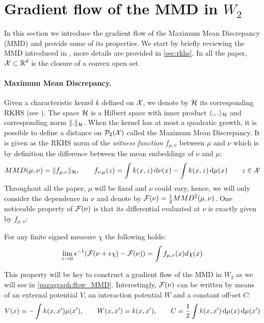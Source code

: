 
\section{Gradient flow of the MMD in $W_2$}\label{sec:gradient_flow}
In this section we introduce the gradient flow of the Maximum Mean Discrepancy (MMD) and provide some of its properties. We start by briefly reviewing the MMD introduced in \cite{gretton2012kernel}, more details are provided in \cref{sec:rkhs}. In all the paper, ${{\mathcal X}}\subset{{\mathbb R}}^d$ is the closure of a convex open set.
\paragraph{Maximum Mean Discrepancy.}\label{subsec:MMD}
Given a characteristic kernel $k$ defined on ${{\mathcal X}}$, we denote by ${{\mathcal H}}$ its corresponding RKHS (see \cite{smola1998learning}). The space ${{\mathcal H}}$ is a Hilbert space with inner product $\langle .,. \rangle_{{{\mathcal H}}}$ and corresponding norm $\Vert . \Vert_{{{\mathcal H}}}$.
When the kernel has at most a quadratic growth, it is possible to define a distance on $\mathcal{P}_2({{\mathcal X}})$ called the Maximum Mean Discrepancy. It is given as the RKHS norm of the \textit{witness function} $f_{\mu,\nu}$ between $\mu$ and $\nu$ which is by definition the difference between the mean embeddings of $\nu$ and $\mu$: 
\begin{align}\label{eq:witness_function}
MMD(\mu,\nu) = \Vert f_{\mu,\nu} \Vert_{{{\mathcal H}}}, \qquad f_{\nu,\mu}(z) = \int k(x,z)\mathop{}\!\mathrm{d} \nu(x) - \int k(x,z)\mathop{}\!\mathrm{d} \mu(x)  \qquad z\in {{\mathcal X}}
\end{align}
Throughout all the paper, $\mu$ will be fixed and $\nu$ could vary, hence, we will only consider the dependence in $\nu$ and denote by ${{\mathcal F}}(\nu)= \frac{1}{2}MMD^2(\mu,\nu)$. One noticeable property of ${{\mathcal F}}(\nu)$ is that its differential evaluated at $\nu$ is exactly given by $f_{\mu,\nu}$:
\begin{proposition}\label{prop:differential_mmd}
	For any finite signed measure $\chi$ the following holds:
	\begin{align}
		\lim_{\epsilon\rightarrow 0} \epsilon^{-1}({{\mathcal F}}(\nu +\epsilon\chi) - {{\mathcal F}}(\nu)) = \int f_{\mu,\nu}(x)d\chi(x) 
	\end{align}
\end{proposition}
This property will be key to construct a gradient flow of the MMD in $W_2$ as we will see in \cref{paragraph:flow_MMD}.
 Interestingly, ${{\mathcal F}}(\nu)$ can be written by means of an external potential $V$, an interaction potential $W$ and a constant off-set $C$:
\begin{align}\label{eq:potentials}
V(x)=-\int  k(x,x')\mu(x'), \qquad
W(x,x')=k(x,x'), \qquad
C = \frac{1}{2} \int k(x,x')\mathop{}\!\mathrm{d}\mu(x) \mathop{}\!\mathrm{d}\mu(x') 
\end{align}
